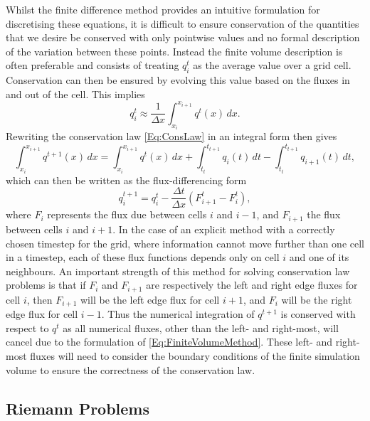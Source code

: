 Whilst the finite difference method provides an intuitive formulation for discretising these equations, it is difficult to ensure conservation of the quantities that we desire be conserved with only pointwise values and no formal description of the variation between these points.
Instead the finite volume description is often preferable and consists of treating $q_i^t$ as the average value over a grid cell.
Conservation can then be ensured by evolving this value based on the fluxes in and out of the cell.
This implies
\begin{equation}
    q_i^t \approx \frac{1}{\Delta x}\int_{x_i}^{x_{i+1}} q^t(x)\, dx.
\end{equation}
Rewriting the conservation law \eqref{Eq:ConsLaw} in an integral form then gives
\begin{equation}
    \int_{x_i}^{x_{i+1}} q^{t+1}(x)\, dx = \int_{x_i}^{x_{i+1}} q^{t}(x)\, dx
                                         + \int_{t_t}^{t_{t+1}} q_i(t)\, dt
                                         - \int_{t_t}^{t_{t+1}} q_{i+1}(t)\, dt,
\end{equation}
which can then be written as the flux-differencing form
\begin{equation}\label{Eq:FiniteVolumeMethod}
    q_i^{t+1} = q_i^t - \frac{\Delta t}{\Delta x}\left( F^t_{i+1} - F^t_{i} \right),
\end{equation}
where $F_i$ represents the flux due between cells $i$ and $i-1$, and $F_{i+1}$ the flux between cells $i$ and $i+1$.
In the case of an explicit method with a correctly chosen timestep for the grid, where information cannot move further than one cell in a timestep, each of these flux functions depends only on cell $i$ and one of its neighbours.
An important strength of this method for solving conservation law problems is that if $F_i$ and $F_{i+1}$ are respectively the left and right edge fluxes for cell $i$, then $F_{i+1}$ will be the left edge flux for cell $i+1$, and $F_{i}$ will be the right edge flux for cell $i-1$.
Thus the numerical integration of $q^{t+1}$ is conserved with respect to $q^t$ as all numerical fluxes, other than the left- and right-most, will cancel due to the formulation of \eqref{Eq:FiniteVolumeMethod}.
These left- and right-most fluxes will need to consider the boundary conditions of the finite simulation volume to ensure the correctness of the conservation law.


\subsection{Riemann Problems}

